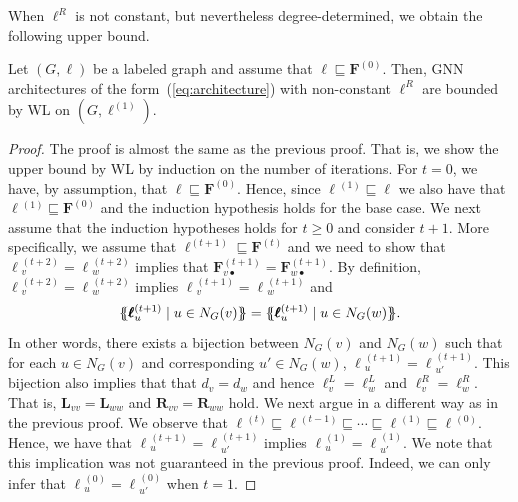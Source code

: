When $\pmb{\ell}^R$ is not constant, but nevertheless degree-determined, we obtain the following upper bound.
\begin{proposition}\label{prop:boundnonconstantR}
Let $(G,\pmb{\ell})$ be a labeled graph and assume that $\pmb{\ell}\sqsubseteq\mathbf{F}^{(0)}$.
Then, GNN architectures of the form~(\ref{eq:architecture}) with non-constant $\pmb{\ell}^R$ are bounded by WL on $(G,\pmb{\ell}^{(1)})$.
\end{proposition}
\begin{proof}
The proof is almost the same as the previous proof. That is,
we show the upper bound by WL by induction on the number of iterations. For $t=0$, we have, by assumption, that 
$\pmb{\ell}\sqsubseteq \mathbf{F}^{(0)}$. Hence, since $\pmb{\ell}{}^{(1)}\sqsubseteq\pmb{\ell}$ we also have that $\pmb{\ell}{}^{(1)}\sqsubseteq\mathbf{F}^{(0)}$ and 
the induction hypothesis holds for the base case.
%
 We next assume that the induction hypotheses holds for $t\geq 0$ and consider $t+1$. More specifically, we assume that 
 $\pmb{\ell}^{(t+1)}\sqsubseteq \mathbf{F}^{(t)}$ and
we need to show that 
$\pmb{\ell}{}^{(t+2)}_v=\pmb{\ell}{}^{(t+2)}_w$ implies that $\mathbf{F}^{(t+1)}_{v\bullet}=\mathbf{F}^{(t+1)}_{w\bullet}$. By definition,
$\pmb{\ell}{}^{(t+2)}_v=\pmb{\ell}{}^{(t+2)}_w$ implies
$\pmb{\ell}{}^{(t+1)}_v=\pmb{\ell}{}^{(t+1)}_w$ and 
$$
\ldbl \pmb{\ell}{}^{(t+1)}_u \st u \in N_G(v) \rdbl=
 \ldbl \pmb{\ell}{}^{(t+1)}_u \st u \in N_G(w) \rdbl.$$
 In other words, there exists a bijection between $N_G(v)$ and $N_G(w)$ such that for each $u\in N_G(v)$ and corresponding $u'\in N_G(w)$, $\pmb{\ell}{}^{(t+1)}_u=\pmb{\ell}{}^{(t+1)}_{u'}$. 
  This bijection also implies that
 that $d_v=d_w$ and hence $\pmb{\ell}^L_{v}=\pmb{\ell}^L_{w}$ and $\pmb{\ell}^{R}_{v}=\pmb{\ell}^R_{w}$. That is,
 $\mathbf{L}_{vv}=\mathbf{L}_{ww}$ and $\mathbf{R}_{vv}=\mathbf{R}_{ww}$ hold.
We next argue in a different way as in the previous proof. We observe that
 $\pmb{\ell}{}^{(t)}\sqsubseteq \pmb{\ell}{}^{(t-1)}\sqsubseteq \cdots\sqsubseteq \pmb{\ell}{}^{(1)}\sqsubseteq \pmb{\ell}{}^{(0)}$. Hence, we have that $\pmb{\ell}{}^{(t+1)}_u=\pmb{\ell}{}^{(t+1)}_{u'}$ implies 
 $\pmb{\ell}{}^{(1)}_u=\pmb{\ell}{}^{(1)}_{u'}$. We note that this implication was not guaranteed in the previous proof. Indeed, we can only infer that  $\pmb{\ell}{}^{(0)}_u=\pmb{\ell}{}^{(0)}_{u'}$ when $t=1$. 

\end{proof}
